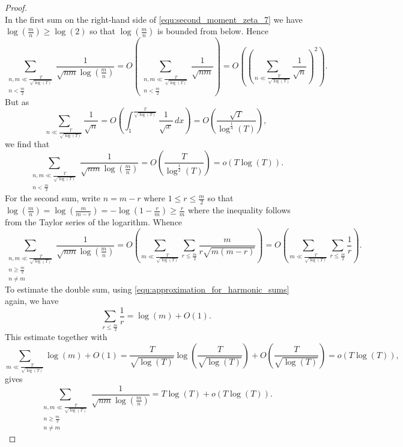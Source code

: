 \begin{proof}
\begin{equation}
      \end{equation}
      In the first sum on the right-hand side of \cref{equ:second_moment_zeta_7} we have $\log\left(\frac{m}{n}\right) \ge \log\left(2\right)$ so that $\log\left(\frac{m}{n}\right)$ is bounded from below. Hence
      \[
        \sum_{\substack{n,m \ll \frac{T}{\sqrt{\log(T)}} \\ n < \frac{m}{2}}}\frac{1}{\sqrt{nm}\log\left(\frac{m}{n}\right)} = O\left(\sum_{\substack{n,m \ll \frac{T}{\sqrt{\log(T)}} \\ n < \frac{m}{2}}}\frac{1}{\sqrt{nm}}\right) = O\left(\left(\sum_{n \ll \frac{T}{\sqrt{\log(T)}}}\frac{1}{\sqrt{n}}\right)^{2}\right).
      \]
      But as
      \[
        \sum_{n \ll \frac{T}{\sqrt{\log(T)}}}\frac{1}{\sqrt{n}} = O\left(\int_{1}^{\frac{T}{\sqrt{\log(T)}}}\frac{1}{\sqrt{x}}\,dx\right) = O\left(\frac{\sqrt{T}}{\log^{\frac{1}{4}}(T)}\right),
      \]
      we find that
      \begin{equation}\label{equ:second_moment_zeta_8}
        \sum_{\substack{n,m \ll \frac{T}{\sqrt{\log(T)}} \\ n < \frac{m}{2}}}\frac{1}{\sqrt{nm}\log\left(\frac{m}{n}\right)} = O\left(\frac{T}{\log^{\frac{1}{2}}(T)}\right) = o(T\log(T)).
      \end{equation}
      For the second sum, write $n = m-r$ where $1 \le r \le \frac{m}{2}$ so that $\log\left(\frac{m}{n}\right) = \log\left(\frac{m}{m-r}\right) = -\log(1-\frac{r}{m}) \ge \frac{r}{m}$ where the inequality follows from the Taylor series of the logarithm. Whence
      \[
        \sum_{\substack{n,m \ll \frac{T}{\sqrt{\log(T)}} \\ n \ge \frac{m}{2} \\ n \neq m}}\frac{1}{\sqrt{nm}\log\left(\frac{m}{n}\right)} = O\left(\sum_{m \ll \frac{T}{\sqrt{\log(T)}}}\sum_{r \le \frac{m}{2}}\frac{m}{r\sqrt{m(m-r)}}\right) = O\left(\sum_{m \ll \frac{T}{\sqrt{\log(T)}}}\sum_{r \le \frac{m}{2}}\frac{1}{r}\right).
      \]
      To estimate the double sum, using \cref{equ:approximation_for_harmonic_sums} again, we have
      \[
        \sum_{r \le \frac{m}{2}}\frac{1}{r} = \log(m)+O(1).
      \]
      This estimate together with
      \[
        \sum_{m \ll \frac{T}{\sqrt{\log(T)}}}\log(m)+O(1) = \frac{T}{\sqrt{\log(T)}}\log\left(\frac{T}{\sqrt{\log(T)}}\right)+O\left(\frac{T}{\sqrt{\log(T)}}\right) = o(T\log(T)),
      \]
      gives
      \begin{equation}\label{equ:second_moment_zeta_9}
        \sum_{\substack{n,m \ll \frac{T}{\sqrt{\log(T)}} \\ n \ge \frac{m}{2} \\ n \neq m}}\frac{1}{\sqrt{nm}\log\left(\frac{m}{n}\right)} = T\log(T)+o(T\log(T)).

\end{equation}
\end{proof}
